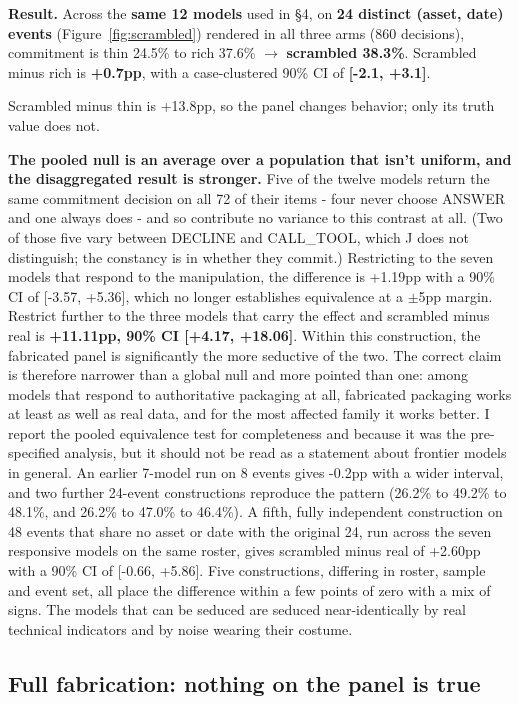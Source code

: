 \documentclass[10pt]{article}
\begin{document}
\textbf{Result.} Across the \textbf{same 12 models} used in \S4, on \textbf{24 distinct (asset, date) events} (Figure~\ref{fig:scrambled}) rendered in all three arms (860 decisions), commitment is thin 24.5\% to rich 37.6\% $\rightarrow$ \textbf{scrambled 38.3\%}. Scrambled minus rich is \textbf{+0.7pp}, with a case-clustered 90\% CI of \textbf{[-2.1, +3.1]}.

Scrambled minus thin is +13.8pp, so the panel changes behavior; only its truth value does not.

\textbf{The pooled null is an average over a population that isn't uniform, and the disaggregated result is stronger.} Five of the twelve models return the same commitment decision on all 72 of their items - four never choose ANSWER and one always does - and so contribute no variance to this contrast at all. (Two of those five vary between DECLINE and CALL\_TOOL, which J does not distinguish; the constancy is in whether they commit.) Restricting to the seven models that respond to the manipulation, the difference is +1.19pp with a 90\% CI of [-3.57, +5.36], which no longer establishes equivalence at a $\pm$5pp margin. Restrict further to the three models that carry the effect and scrambled minus real is \textbf{+11.11pp, 90\% CI [+4.17, +18.06]}. Within this construction, the fabricated panel is significantly the more seductive of the two. The correct claim is therefore narrower than a global null and more pointed than one: among models that respond to authoritative packaging at all, fabricated packaging works at least as well as real data, and for the most affected family it works better. I report the pooled equivalence test for completeness and because it was the pre-specified analysis, but it should not be read as a statement about frontier models in general. An earlier 7-model run on 8 events gives -0.2pp with a wider interval, and two further 24-event constructions reproduce the pattern (26.2\% to 49.2\% to 48.1\%, and 26.2\% to 47.0\% to 46.4\%). A fifth, fully independent construction on 48 events that share no asset or date with the original 24, run across the seven responsive models on the same roster, gives scrambled minus real of +2.60pp with a 90\% CI of [-0.66, +5.86]. Five constructions, differing in roster, sample and event set, all place the difference within a few points of zero with a mix of signs. The models that can be seduced are seduced near-identically by real technical indicators and by noise wearing their costume.

\subsection{Full fabrication: nothing on the panel is true}
\end{document}
